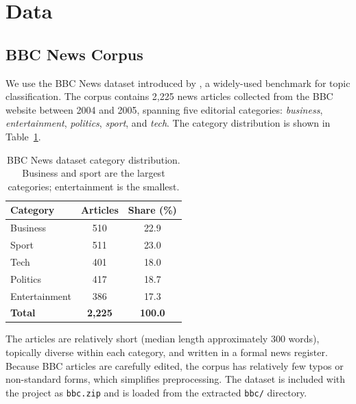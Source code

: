 \section{Data}
\label{sec:data}

\subsection{BBC News Corpus}
We use the BBC News dataset introduced by \citet{greene2006practical}, a widely-used benchmark for topic classification. The corpus contains 2,225 news articles collected from the BBC website between 2004 and 2005, spanning five editorial categories: \textit{business}, \textit{entertainment}, \textit{politics}, \textit{sport}, and \textit{tech}. The category distribution is shown in Table~\ref{tab:dataset}.

\begin{table}[h]
\centering
\begin{tabular}{lcc}
\toprule
\textbf{Category} & \textbf{Articles} & \textbf{Share (\%)} \\
\midrule
Business      & 510 & 22.9 \\
Sport         & 511 & 23.0 \\
Tech          & 401 & 18.0 \\
Politics      & 417 & 18.7 \\
Entertainment & 386 & 17.3 \\
\midrule
\textbf{Total} & \textbf{2,225} & \textbf{100.0} \\
\bottomrule
\end{tabular}
\caption{BBC News dataset category distribution. Business and sport are the largest categories; entertainment is the smallest.}
\label{tab:dataset}
\end{table}

The articles are relatively short (median length approximately 300 words), topically diverse within each category, and written in a formal news register. Because BBC articles are carefully edited, the corpus has relatively few typos or non-standard forms, which simplifies preprocessing. The dataset is included with the project as \texttt{bbc.zip} and is loaded from the extracted \texttt{bbc/} directory.


